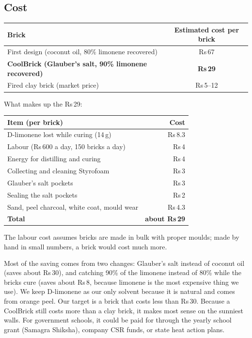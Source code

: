 \documentclass[11pt,a4paper]{article}
\providecommand{\rupee}{Rs}
\begin{document}
\subsection{Cost}
\begin{center}
\begin{tabular}{lc}
\toprule
Brick & Estimated cost per brick \\
\midrule
First design (coconut oil, 80\% limonene recovered) & \rupee\,67 \\
\textbf{CoolBrick (Glauber's salt, 90\% limonene recovered)} & \textbf{\rupee\,29} \\
Fired clay brick (market price) & \rupee\,5--12 \\
\bottomrule
\end{tabular}
\end{center}
What makes up the \rupee\,29:
\begin{center}
\begin{tabular}{lr}
\toprule
Item (per brick) & Cost \\
\midrule
D-limonene lost while curing (14\,g) & \rupee\,8.3 \\
Labour (\rupee\,600 a day, 150 bricks a day) & \rupee\,4 \\
Energy for distilling and curing & \rupee\,4 \\
Collecting and cleaning Styrofoam & \rupee\,3 \\
Glauber's salt pockets & \rupee\,3 \\
Sealing the salt pockets & \rupee\,2 \\
Sand, peel charcoal, white coat, mould wear & \rupee\,4.3 \\
\midrule
\textbf{Total} & \textbf{about \rupee\,29} \\
\bottomrule
\end{tabular}
\end{center}
The labour cost assumes bricks are made in bulk with proper moulds; made by
hand in small numbers, a brick would cost much more.

Most of the saving comes from two changes: Glauber's salt instead of coconut
oil (saves about \rupee\,30), and catching 90\% of the limonene instead of
80\% while the bricks cure (saves about \rupee\,8, because limonene is the
most expensive thing we use). We keep D-limonene as our only solvent because
it is natural and comes from orange peel. Our target is a brick that costs
less than \rupee\,30. Because a CoolBrick still costs more than a
clay brick, it makes most sense on the sunniest walls. For government
schools, it could be paid for through the yearly school grant (Samagra
Shiksha), company CSR funds, or state heat action plans.
\end{document}
